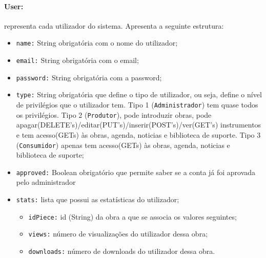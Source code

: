 \paragraph{\textbf{User:}} representa cada utilizador do sistema. Apresenta a seguinte estrutura:
    \begin{itemize}
        \item \texttt{name:} String obrigatória com o nome do utilizador;
        \item \texttt{email:} String obrigatória com o email;
        \item \texttt{password:} String obrigatória com a password;
        \item \texttt{type:} String obrigatória que define o tipo de utilizador, ou seja, define o nível de privilégios que o utilizador tem. Tipo 1 (\texttt{Administrador}) tem quase todos os privilégios. Tipo 2 (\texttt{Produtor}), pode introduzir obras, pode apagar(DELETE's)/editar(PUT's)/inserir(POST's)/ver(GET's) instrumentos e tem acesso(GETs) às obras, agenda, noticias e biblioteca de suporte. Tipo 3 (\texttt{Consumidor}) apenas tem acesso(GETs) às obras, agenda, noticias e biblioteca de suporte;
        \item \texttt{approved:} Boolean obrigatório que permite saber se a conta já foi aprovada pelo administrador
        \item \texttt{stats:} lista que possui as estatísticas do utilizador;
            \begin{itemize}
                \item \texttt{idPiece:} id (String) da obra a que se associa os valores seguintes;
                \item \texttt{views:} número de visualizações do utilizador dessa obra;
                \item \texttt{downloads:} número de downloads do utilizador dessa obra.
            \end{itemize}
    \end{itemize}

